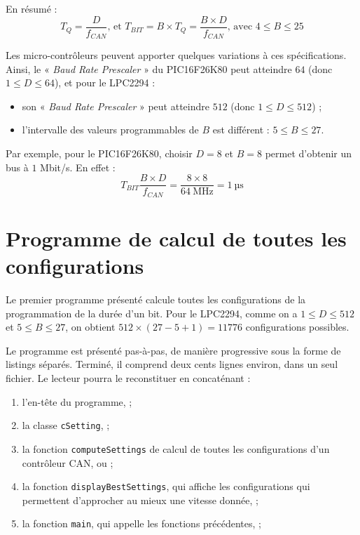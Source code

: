 En résumé :
\begin{equation*}
  T_Q = \frac{D}{f_{CAN}} \text{, et~}T_{BIT} = B \times T_Q = \frac{B\times D}{f_{CAN}}\text{, avec~} 4 \leqslant B \leqslant 25
\end{equation*}


Les micro-contrôleurs peuvent apporter quelques variations à ces spécifications. Ainsi, le « \emph{Baud Rate Prescaler} » du PIC16F26K80 peut atteindre $64$ (donc $1 \leqslant D \leqslant 64$), et pour le LPC2294 :
\begin{itemize}
  \item son « \emph{Baud Rate Prescaler} » peut atteindre $512$ (donc $1 \leqslant D \leqslant 512$) ;
  \item l'intervalle des valeurs programmables de $B$ est différent : $5 \leqslant B \leqslant 27$.
\end{itemize}

Par exemple, pour le PIC16F26K80, choisir $D=8$ et $B=8$ permet d'obtenir un bus à $1$ Mbit/s. En effet :
\begin{equation*}
  T_{BIT} \frac{B\times D}{f_{CAN}} = \frac{8\times 8}{64~\text{MHz}} = 1~\text{µs}
\end{equation*}

\section{Programme de calcul de toutes les configurations}

Le premier programme présenté calcule toutes les configurations de la programmation de la durée d'un bit. Pour le LPC2294, comme on a $1 \leqslant D \leqslant 512$ et $5 \leqslant B \leqslant 27$, on obtient $512 \times (27 - 5 + 1) = 11776$ configurations possibles.

Le programme est présenté pas-à-pas, de manière progressive sous la forme de listings séparés. Terminé, il comprend deux cents lignes environ, dans un seul fichier. Le lecteur pourra le reconstituer en concaténant :
\begin{enumerate}
  \item l'en-tête du programme,  ;
  \item la classe \texttt{cSetting},  ;
  \item la fonction \texttt{computeSettings} de calcul de toutes les configurations d'un contrôleur CAN,  ou  ;
  \item la fonction \texttt{displayBestSettings}, qui affiche les configurations qui permettent d'approcher au mieux une vitesse donnée,  ;
  \item la fonction \texttt{main}, qui appelle les fonctions précédentes,  ;
\end{enumerate}









